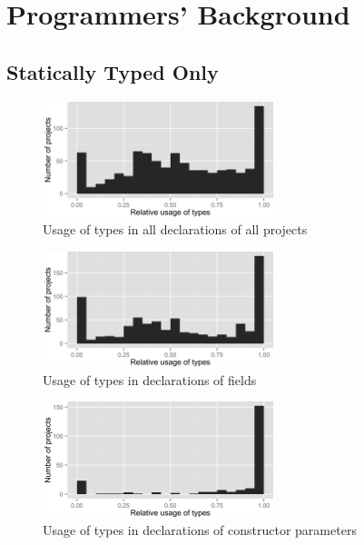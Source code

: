 \FloatBarrier
\section{Programmers' Background\label{a:background}}

\subsection*{Statically Typed Only}

\begin{figure}[h]
\centering 
\includegraphics[width=0.6\textwidth]{../aosd_2014/analysis/result/background/static-only/histograms/5_all_types.png} 
\caption{Usage of types in all declarations of all projects}
\end{figure}

\begin{figure}[h]
\centering 
\includegraphics[width=0.6\textwidth]{../aosd_2014/analysis/result/background/static-only/histograms/10_Field.png} 
\caption{Usage of types in declarations of fields}
\end{figure}

\begin{figure}[h]
\centering 
\includegraphics[width=0.6\textwidth]{../aosd_2014/analysis/result/background/static-only/histograms/9_Constructor_Parameter.png} 
\caption{Usage of types in declarations of constructor parameters}
\end{figure}

